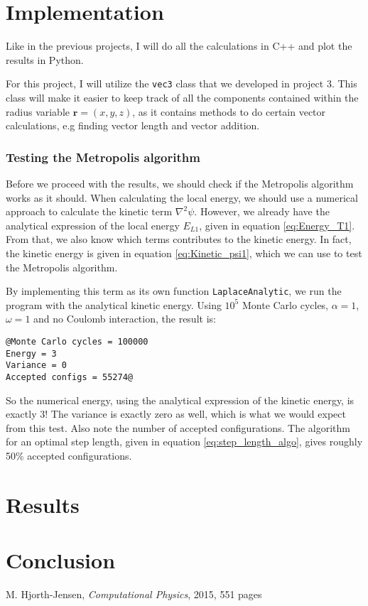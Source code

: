 \documentclass[12pt]{article}
\begin{document}
\section{Implementation} \label{section:implement}
Like in the previous projects, I will do all the calculations in C++ and plot the results in Python.

For this project, I will utilize the \texttt{vec3} class that we developed in project 3. This class will make it easier to keep track of all the components contained within the radius variable $\mathbf{r} = (x, y, z)$, as it contains methods to do certain vector calculations, e.g finding vector length and vector addition. 
\subsubsection*{Testing the Metropolis algorithm}
Before we proceed with the results, we should check if the Metropolis algorithm works as it should. When calculating the local energy, we should use a numerical approach to calculate the kinetic term $\nabla^2\psi$. However, we already have the analytical expression of the local energy $E_{L1}$, given in equation \ref{eq:Energy_T1}. From that, we also know which terms contributes to the kinetic energy. In fact, the kinetic energy is given in equation \ref{eq:Kinetic_psi1}, which we can use to test the Metropolis algorithm.

By implementing this term as its own function \texttt{LaplaceAnalytic}, we run the program with the analytical kinetic energy. Using $10^5$ Monte Carlo cycles, $\alpha = 1$, $\omega = 1$ and no Coulomb interaction, the result is:
\begin{lstlisting}
@Monte Carlo cycles = 100000
Energy = 3
Variance = 0
Accepted configs = 55274@
\end{lstlisting}
So the numerical energy, using the analytical expression of the kinetic energy, is exactly 3! The variance is exactly zero as well, which is what we would expect from this test. Also note the number of accepted configurations. The algorithm for an optimal step length, given in equation \ref{eq:step_length_algo}, gives roughly 50\% accepted configurations. 
\section{Results}\label{section:results}

\FloatBarrier
\section{Conclusion}\label{section:conclusion}

\FloatBarrier
\begin{thebibliography}{1}
     M. Hjorth-Jensen, \emph{Computational Physics}, 2015, 551 pages
\end{thebibliography}
\end{document}

